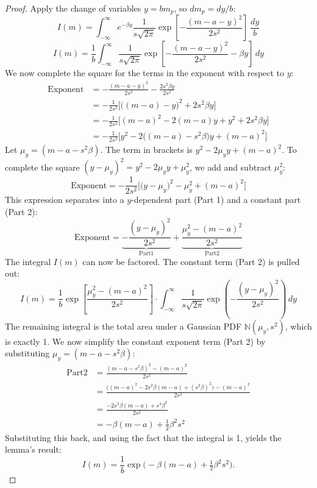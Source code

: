 \documentclass[extra,mreferee]{gji}
\theoremstyle{lemma}
\def\N{\mathbb{N}}
\begin{document}
\begin{proof}
Apply the change of variables \(y=b m_p\), so \(dm_p=dy/b\):
\[
I(m) = \int_{-\infty}^{\infty} e^{-\beta y} \frac{1}{s\sqrt{2\pi}}\exp\!\left[-\frac{(m-a-y)^2}{2s^2}\right]\,\frac{dy}{b}
\]
\[
I(m) = \frac{1}{b} \int_{-\infty}^{\infty} \frac{1}{s\sqrt{2\pi}} \exp\!\left[ -\frac{(m-a-y)^2}{2s^2} - \beta y \right] \,dy
\]
We now complete the square for the terms in the exponent with respect to \(y\):
\begin{align*}
\mathrm{Exponent} &= -\frac{(m-a-y)^2}{2s^2} - \frac{2s^2\beta y}{2s^2} \\
&= -\frac{1}{2s^2}\Big[ \big((m-a)-y\big)^2 + 2s^2\beta y \Big] \\
&= -\frac{1}{2s^2}\Big[ (m-a)^2 - 2(m-a)y + y^2 + 2s^2\beta y \Big] \\
&= -\frac{1}{2s^2}\Big[ y^2 - 2\big( (m-a) - s^2\beta \big)y + (m-a)^2 \Big]
\end{align*}
Let \(\mu_y = (m-a-s^2\beta)\). The term in brackets is \(y^2 - 2\mu_y y + (m-a)^2\). To complete the square \((y-\mu_y)^2 = y^2 - 2\mu_y y + \mu_y^2\), we add and subtract \(\mu_y^2\):
\[
\mathrm{Exponent} = -\frac{1}{2s^2}\Big[ \big(y - \mu_y\big)^2 - \mu_y^2 + (m-a)^2 \Big]
\]
This expression separates into a \(y\)-dependent part (Part 1) and a constant part (Part 2):
\[
\mathrm{Exponent} = \underbrace{-\frac{(y - \mu_y)^2}{2s^2}}_{\mathrm{Part 1}} + \underbrace{\frac{\mu_y^2 - (m-a)^2}{2s^2}}_{\mathrm{Part 2}}
\]
The integral \(I(m)\) can now be factored. The constant term (Part 2) is pulled out:
\[
I(m) = \frac{1}{b} \exp\!\left[ \frac{\mu_y^2 - (m-a)^2}{2s^2} \right] \cdot \int_{-\infty}^{\infty} \frac{1}{s\sqrt{2\pi}} \exp\!\left( -\frac{(y - \mu_y)^2}{2s^2} \right) \,dy
\]
The remaining integral is the total area under a Gaussian PDF \(\N(\mu_y, s^2)\), which is exactly 1. We now simplify the constant exponent term (Part 2) by substituting \(\mu_y = (m-a-s^2\beta)\):
\begin{align*}
\mathrm{Part 2} &= \frac{(m-a-s^2\beta)^2 - (m-a)^2}{2s^2} \\
&= \frac{\big( (m-a)^2 - 2s^2\beta(m-a) + (s^2\beta)^2 \big) - (m-a)^2}{2s^2} \\
&= \frac{-2s^2\beta(m-a) + s^4\beta^2}{2s^2} \\
&= -\beta(m-a) + \frac{1}{2}\beta^2 s^2
\end{align*}
Substituting this back, and using the fact that the integral is 1, yields the lemma's result:
\[
I(m) = \frac{1}{b}\exp\!\Big(-\beta(m-a)+\tfrac{1}{2}\beta^2 s^2\Big).
\]
\end{proof}
\end{document}
